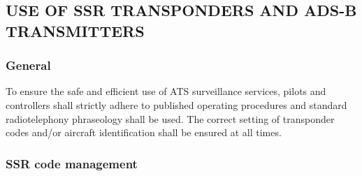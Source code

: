 \subsection[Use of SSR transponders and ADS-B transmitters]{USE OF SSR TRANSPONDERS AND ADS-B TRANSMITTERS}

\subsubsection{General}

To ensure the safe and efficient use of ATS surveillance services, pilots and controllers shall strictly adhere to published operating procedures and standard radiotelephony phraseology shall be used. The correct setting of transponder codes and/or aircraft identification shall be ensured at all times.

\subsubsection{SSR code management}

